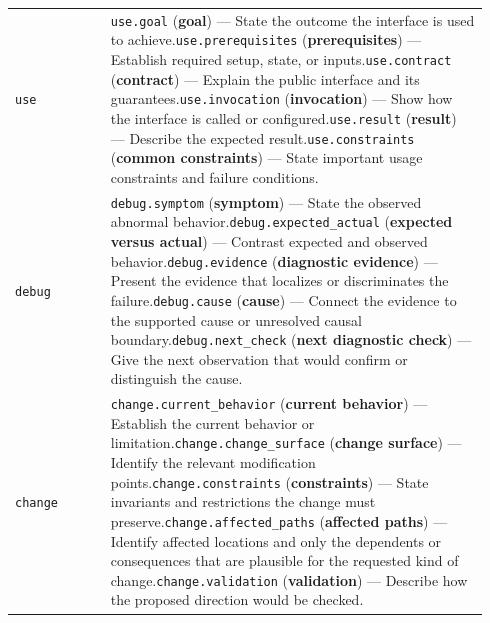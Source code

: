\begin{longtable}{@{}L{0.19\linewidth}L{0.75\linewidth}@{}}
\texttt{use} & \texttt{use.goal} (\textbf{goal}) --- State the outcome the interface is used to achieve.\newline{}\texttt{use.prerequisites} (\textbf{prerequisites}) --- Establish required setup, state, or inputs.\newline{}\texttt{use.contract} (\textbf{contract}) --- Explain the public interface and its guarantees.\newline{}\texttt{use.invocation} (\textbf{invocation}) --- Show how the interface is called or configured.\newline{}\texttt{use.result} (\textbf{result}) --- Describe the expected result.\newline{}\texttt{use.constraints} (\textbf{common constraints}) --- State important usage constraints and failure conditions. \\
\texttt{debug} & \texttt{debug.symptom} (\textbf{symptom}) --- State the observed abnormal behavior.\newline{}\texttt{debug.expected\_actual} (\textbf{expected versus actual}) --- Contrast expected and observed behavior.\newline{}\texttt{debug.evidence} (\textbf{diagnostic evidence}) --- Present the evidence that localizes or discriminates the failure.\newline{}\texttt{debug.cause} (\textbf{cause}) --- Connect the evidence to the supported cause or unresolved causal boundary.\newline{}\texttt{debug.next\_check} (\textbf{next diagnostic check}) --- Give the next observation that would confirm or distinguish the cause. \\
\texttt{change} & \texttt{change.current\_behavior} (\textbf{current behavior}) --- Establish the current behavior or limitation.\newline{}\texttt{change.change\_surface} (\textbf{change surface}) --- Identify the relevant modification points.\newline{}\texttt{change.constraints} (\textbf{constraints}) --- State invariants and restrictions the change must preserve.\newline{}\texttt{change.affected\_paths} (\textbf{affected paths}) --- Identify affected locations and only the dependents or consequences that are plausible for the requested kind of change.\newline{}\texttt{change.validation} (\textbf{validation}) --- Describe how the proposed direction would be checked. \\

\end{longtable}
